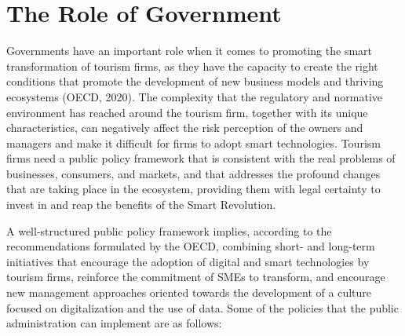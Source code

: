 \documentclass[
  letterpaper,
  DIV=11,
  numbers=noendperiod]{scrreprt}
\begin{document}
\hypertarget{the-role-of-government}{%
\section{The Role of Government}\label{the-role-of-government}}

Governments have an important role when it comes to promoting the smart
transformation of tourism firms, as they have the capacity to create the
right conditions that promote the development of new business models and
thriving ecosystems (OECD, 2020). The complexity that the regulatory and
normative environment has reached around the tourism firm, together with
its unique characteristics, can negatively affect the risk perception of
the owners and managers and make it difficult for firms to adopt smart
technologies. Tourism firms need a public policy framework that is
consistent with the real problems of businesses, consumers, and markets,
and that addresses the profound changes that are taking place in the
ecosystem, providing them with legal certainty to invest in and reap the
benefits of the Smart Revolution.

A well-structured public policy framework implies, according to the
recommendations formulated by the OECD, combining short- and long-term
initiatives that encourage the adoption of digital and smart
technologies by tourism firms, reinforce the commitment of SMEs to
transform, and encourage new management approaches oriented towards the
development of a culture focused on digitalization and the use of data.
Some of the policies that the public administration can implement are as
follows:
\end{document}
